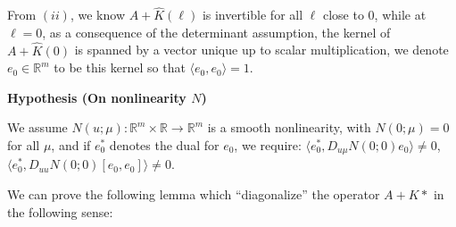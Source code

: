 \documentclass[letterpaper,11pt]{article}
\newcommand{\R}{\mathbb{R}}
\numberwithin{equation}{section}
\newenvironment{Hypothesis}[1]%
  {\begin{trivlist}\item[]{\bf Hypothesis #1 }\em}{\end{trivlist}}
\theoremstyle{plain}
\begin{document}
From $(ii)$, we know $A+\widehat{K}(\ell)$ is invertible for all $\ell$ close to $0$, while at $\ell = 0$, as a consequence of the determinant assumption, the kernel of $A + \widehat{K}(0)$ is spanned by a vector unique up to scalar multiplication, we denote $e_0 \in \R^m$ to be this kernel so that $\langle e_0, e_0\rangle =1$.


\begin{Hypothesis} {(On nonlinearity $N$)}
\item 
We assume $N(u;\mu): \R^m \times \R \to \R^m$ is a smooth nonlinearity, with $N(0;\mu) = 0$ for all $\mu$, and if $e_0^*$ denotes the dual for $e_0$, we require: $\langle e_0^*, D_{u\mu} N(0;0)e_0 \rangle \neq 0$, $\langle e_0^*, D_{uu}N(0;0)[e_0,e_0] \rangle \neq 0$.
\end{Hypothesis}


We can prove the following lemma which ``diagonalize'' the operator $A+K\ast$ in the following sense:
\end{document}
